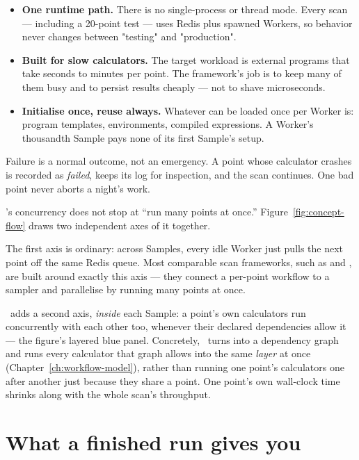 \begin{itemize}
  \item \textbf{One runtime path.} There is no single-process or thread mode. Every
        scan --- including a 20-point test --- uses Redis plus spawned Workers, so
        behavior never changes between "testing" and "production".
  \item \textbf{Built for slow calculators.} The target workload is external programs
        that take seconds to minutes per point. The framework's job is to keep many of
        them busy and to persist results cheaply --- not to shave microseconds.
  \item \textbf{Initialise once, reuse always.} Whatever can be loaded once per Worker
        is: program templates, environments, compiled expressions. A Worker's
        thousandth Sample pays none of its first Sample's setup.
\end{itemize}

\begin{jnote}
Failure is a normal outcome, not an emergency. A point whose calculator crashes is
recorded as \emph{failed}, keeps its log for inspection, and the scan continues. One
bad point never aborts a night's work.
\end{jnote}

\Jtwo's concurrency does not stop at ``run many points at once.'' Figure~\ref{fig:concept-flow}
draws two independent axes of it together.

The first axis is ordinary: across Samples, every idle Worker just pulls the next point
off the same Redis queue. Most comparable scan frameworks, such as
\cite{Shang:2023gfy} and \cite{Goodsell:2023iac}, are
built around exactly this axis --- they connect a per-point workflow to a sampler and
parallelise by running many points at once.

\Jtwo\ adds a second axis, \emph{inside} each Sample: a point's own calculators run
concurrently with each other too, whenever their declared dependencies allow it --- the
figure's layered blue panel. Concretely, \Jtwo\ turns  into a
dependency graph and runs every calculator that graph allows into the same \emph{layer}
at once (Chapter~\ref{ch:workflow-model}), rather than running one point's calculators
one after another just because they share a point. One point's own wall-clock time
shrinks along with the whole scan's throughput.



\section{What a finished run gives you}
\label{sec:what-you-produce}

